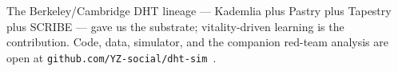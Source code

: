 \documentclass[conference]{IEEEtran}
\begin{document}
The Berkeley/Cambridge DHT lineage --- Kademlia plus Pastry plus
Tapestry plus SCRIBE --- gave us the substrate; vitality-driven
learning is the contribution. Code, data, simulator, and the companion
red-team analysis are open at
\texttt{github.com/YZ-social/dht-sim}~\cite{dhtsim2026}.



\end{document}
